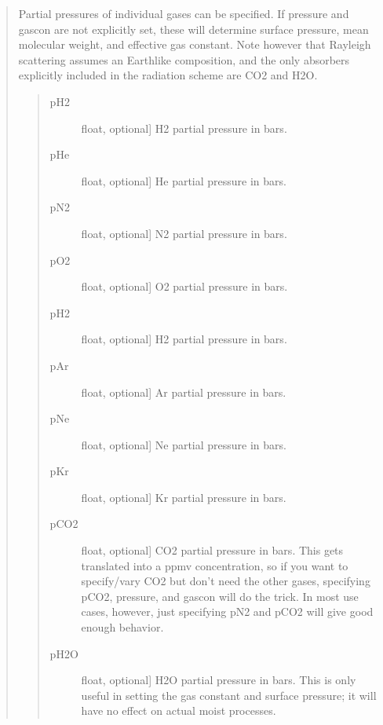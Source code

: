 \documentclass[letterpaper,10pt,english]{sphinxmanual}
\begin{document}
\begin{fulllineitems}
\begin{fulllineitems}
\begin{quote}

Partial pressures of individual gases can be specified. If pressure and gascon are not explicitly set, these will determine surface pressure, mean molecular weight, and effective gas constant. Note however that Rayleigh scattering assumes an Earth\sphinxhyphen{}like composition, and the only absorbers explicitly included in the radiation scheme are CO2 and H2O.
\begin{quote}
\begin{description}
\item[{pH2}] \leavevmode{[}float, optional{]}
H2 partial pressure in bars.

\item[{pHe}] \leavevmode{[}float, optional{]}
He partial pressure in bars.

\item[{pN2}] \leavevmode{[}float, optional{]}
N2 partial pressure in bars.

\item[{pO2}] \leavevmode{[}float, optional{]}
O2 partial pressure in bars.

\item[{pH2}] \leavevmode{[}float, optional{]}
H2 partial pressure in bars.

\item[{pAr}] \leavevmode{[}float, optional{]}
Ar partial pressure in bars.

\item[{pNe}] \leavevmode{[}float, optional{]}
Ne partial pressure in bars.

\item[{pKr}] \leavevmode{[}float, optional{]}
Kr partial pressure in bars.

\item[{pCO2}] \leavevmode{[}float, optional{]}
CO2 partial pressure in bars. This gets translated into a ppmv concentration, so if you want to specify/vary CO2 but don’t need the other gases, specifying pCO2, pressure, and gascon will do the trick. In most use cases, however, just specifying pN2 and pCO2 will give good enough behavior.

\item[{pH2O}] \leavevmode{[}float, optional{]}
H2O partial pressure in bars. This is only useful in setting the gas constant and surface pressure; it will have no effect on actual moist processes.

\end{description}
\end{quote}


\end{quote}
\end{fulllineitems}
\end{fulllineitems}
\end{document}
